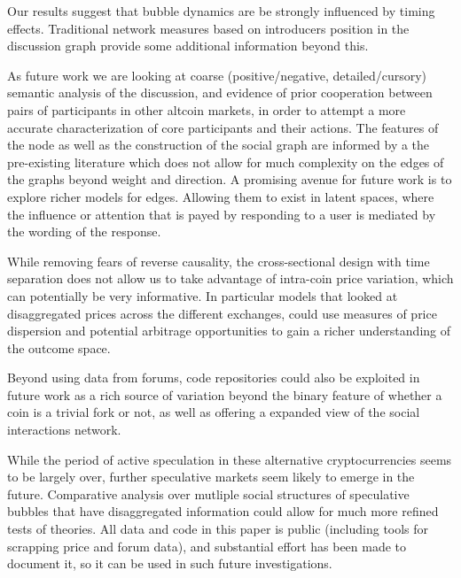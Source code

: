 Our results suggest that bubble dynamics are be strongly influenced by timing effects. Traditional network measures based on introducers position in the discussion graph provide some additional  information beyond this.

As future work we are looking at coarse (positive/negative, detailed/cursory) semantic analysis of the discussion, and evidence of prior cooperation between pairs of participants in other altcoin markets, in order to attempt a more accurate characterization of core participants and their actions.
The features of the node as well as the construction of the social graph are informed by a the pre-existing literature which does not allow for much complexity on the edges of the graphs beyond weight and direction.
A promising avenue for future work is to explore richer models for edges. Allowing them to exist in latent spaces, where the influence or attention that is payed by responding to a user is mediated by the wording of the response. 

While removing fears of reverse causality, the cross-sectional design with time separation does not allow us to take advantage of intra-coin price variation, which can potentially be very informative.
In particular models that looked at disaggregated prices across the different exchanges, could use measures of price dispersion and potential arbitrage opportunities to gain a richer understanding of the outcome space.

Beyond using data from forums, code repositories could also be exploited in future work as a rich source of variation beyond the binary feature of whether a coin is a trivial fork or not, as well as offering a expanded view of the social interactions network.


While the period of active speculation in these alternative cryptocurrencies seems to be largely over, further speculative markets seem likely to emerge in the future. Comparative analysis over mutliple social structures of speculative bubbles that have disaggregated information could allow for much more refined tests of theories. 
All data and code in this paper is public (including tools for scrapping price and forum data), and substantial effort has been made to document it, so it can be used in such future investigations. 
